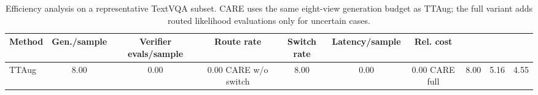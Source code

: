 \begin{table}[t]
\centering
\small
\caption{Efficiency analysis on a representative TextVQA subset. CARE uses the same eight-view generation budget as TTAug; the full variant adds routed likelihood evaluations only for uncertain cases.}
\label{tab:efficiency_care}
\begin{tabular}{lcccccc}
\toprule
Method & Gen./sample & Verifier evals/sample & Route rate & Switch rate & Latency/sample & Rel. cost \\
\midrule
TTAug & 8.00 & 0.00 & 0.00%
CARE w/o switch & 8.00 & 0.00 & 0.00%
CARE full & 8.00 & 5.16 & 4.55%
\bottomrule
\end{tabular}
\end{table}
